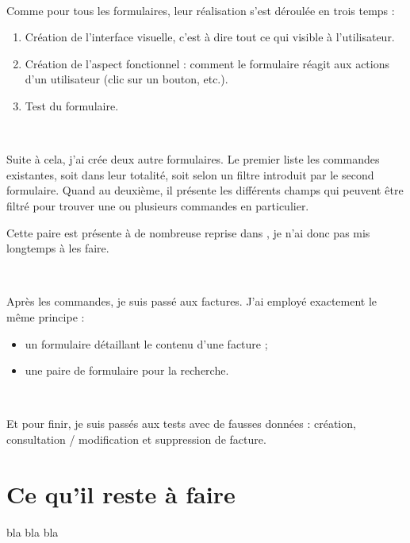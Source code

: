 ~

Comme pour tous les formulaires, leur réalisation s'est déroulée en trois temps :
\begin{enumerate}
	\item Création de l'interface visuelle, c'est à dire tout ce qui visible à l'utilisateur.
	\item Création de l'aspect fonctionnel : comment le formulaire réagit aux actions d'un utilisateur (clic sur un bouton, etc.).
	\item Test du formulaire.
\end{enumerate}

~

Suite à cela, j'ai crée deux autre formulaires. Le premier liste les commandes existantes, soit dans leur totalité, soit selon un filtre introduit par le second formulaire. Quand au deuxième, il présente les différents champs qui peuvent être filtré pour trouver une ou plusieurs commandes en particulier.

Cette paire est présente à de nombreuse reprise dans \integrale, je n'ai donc pas mis longtemps à les faire.

~

Après les commandes, je suis passé aux factures. J'ai employé exactement le même principe :
\begin{itemize}
	\item un formulaire détaillant le contenu d'une facture ;
	\item une paire de formulaire pour la recherche.
\end{itemize}

~

Et pour finir, je suis passés aux tests avec de fausses données : création, consultation / modification et suppression de facture.


\section{Ce qu'il reste à faire}
bla bla bla

